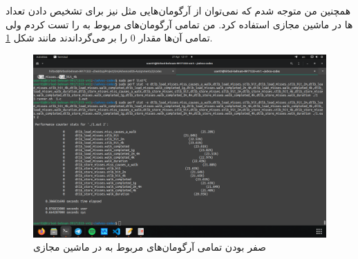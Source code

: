 همچنین من متوجه شدم که نمی‌توان از آرگومان‌هایی مثل
نیز برای تشخیص دادن تعداد
ها
در ماشین مجازی استفاده کرد. من تمامی آرگومان‌های مربوط به
را تست کردم ولی تمامی آن‌ها مقدار
0
را بر می‌گرداندند مانند شکل
\ref{fig:no_tlb_miss}.
\begin{figure}[H]
    \centering
    \includegraphics[scale=0.25]{pic/1-tlb-miss-vm.png}
    \caption{صفر بودن تمامی آرگومان‌های مربوط به  در ماشین مجازی}
    \label{fig:no_tlb_miss}
\end{figure}

